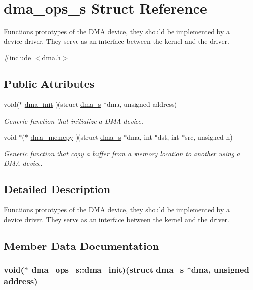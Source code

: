 \hypertarget{structdma__ops__s}{\section{dma\-\_\-ops\-\_\-s Struct Reference}
\label{structdma__ops__s}
}


Functions prototypes of the D\-M\-A device, they should be implemented by a device driver. They serve as an interface between the kernel and the driver.  




{\ttfamily \#include $<$dma.\-h$>$}

\subsection*{Public Attributes}
\begin{DoxyCompactItemize}
\item 
void($\ast$ \hyperlink{structdma__ops__s_aa1ac2356cd662860a73d46a0d140154f}{dma\-\_\-init} )(struct \hyperlink{structdma__s}{dma\-\_\-s} $\ast$dma, unsigned address)
\begin{DoxyCompactList}\small\item\em Generic function that initialize a D\-M\-A device. \end{DoxyCompactList}\item 
void $\ast$($\ast$ \hyperlink{structdma__ops__s_a4d6f4471ec92c929885e182d8efd1186}{dma\-\_\-memcpy} )(struct \hyperlink{structdma__s}{dma\-\_\-s} $\ast$dma, int $\ast$dst, int $\ast$src, unsigned n)
\begin{DoxyCompactList}\small\item\em Generic function that copy a buffer from a memory location to another using a D\-M\-A device. \end{DoxyCompactList}\end{DoxyCompactItemize}


\subsection{Detailed Description}
Functions prototypes of the D\-M\-A device, they should be implemented by a device driver. They serve as an interface between the kernel and the driver. 

\subsection{Member Data Documentation}
\hypertarget{structdma__ops__s_aa1ac2356cd662860a73d46a0d140154f}{
\subsubsection[{dma\-\_\-init}]{\setlength{\rightskip}{0pt plus 5cm}void($\ast$ dma\-\_\-ops\-\_\-s\-::dma\-\_\-init)(struct {\bf dma\-\_\-s} $\ast$dma, unsigned address)}}\label{structdma__ops__s_aa1ac2356cd662860a73d46a0d140154f}


